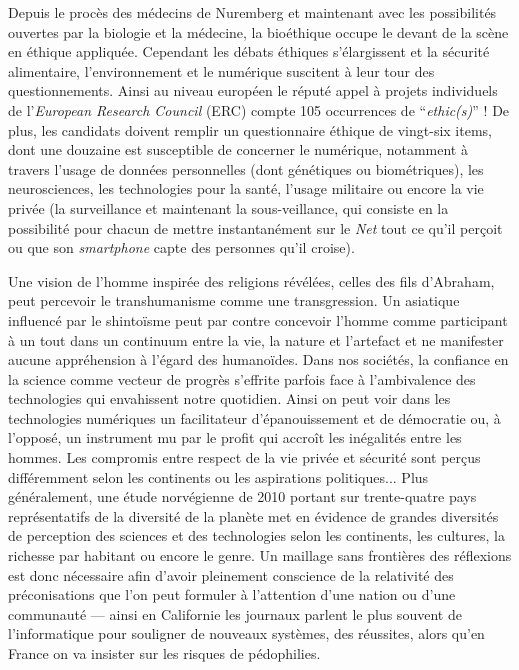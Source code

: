 Depuis le procès des médecins de Nuremberg et maintenant avec les possibilités ouvertes par la biologie et la médecine, la bioéthique occupe le devant de la scène en éthique appliquée. Cependant les débats éthiques s’élargissent et la sécurité alimentaire, l’environnement et le numérique suscitent à leur tour des questionnements. Ainsi au niveau européen le réputé appel à projets individuels de l’\textit{European Research Council} (ERC) compte 105 occurrences de “\textit{ethic(s)}” ! De plus, les candidats doivent remplir un questionnaire éthique de vingt-six items, dont une douzaine est susceptible de concerner le numérique, notamment à travers l’usage de données personnelles (dont génétiques ou biométriques), les neurosciences, les technologies pour la santé, l’usage militaire ou encore la vie privée (la surveillance et maintenant la sous-veillance, qui consiste en la possibilité pour chacun de mettre instantanément sur le \textit{Net} tout ce qu’il perçoit ou que son \textit{smartphone} capte des personnes qu’il croise).


Une vision de l’homme inspirée des religions révélées, celles des fils d’Abraham, peut percevoir le transhumanisme comme une transgression. Un asiatique influencé par le shintoïsme peut par contre concevoir l’homme comme participant à un tout dans un continuum entre la vie, la nature et l’artefact et ne manifester aucune appréhension à l’égard des humanoïdes. Dans nos sociétés, la confiance en la science comme vecteur de progrès s’effrite parfois face à l’ambivalence des technologies qui envahissent notre quotidien. Ainsi on peut voir dans les technologies numériques un facilitateur d’épanouissement et de démocratie ou, à l’opposé, un instrument mu par le profit qui accroît les inégalités entre les hommes. Les compromis entre respect de la vie privée et sécurité sont perçus différemment selon les continents ou les aspirations politiques... Plus généralement, une étude norvégienne de 2010 portant sur trente-quatre pays représentatifs de la diversité de la planète met en évidence de grandes diversités de perception des sciences et des technologies selon les continents, les cultures, la richesse par habitant ou encore le genre. Un maillage sans frontières des réflexions est donc nécessaire afin d’avoir pleinement conscience de la relativité des préconisations que l’on peut formuler à l’attention d’une nation ou d’une communauté --- ainsi en Californie les journaux parlent le plus souvent de l’informatique pour souligner de nouveaux systèmes, des réussites, alors qu’en France on va insister sur les risques de pédophilies.

